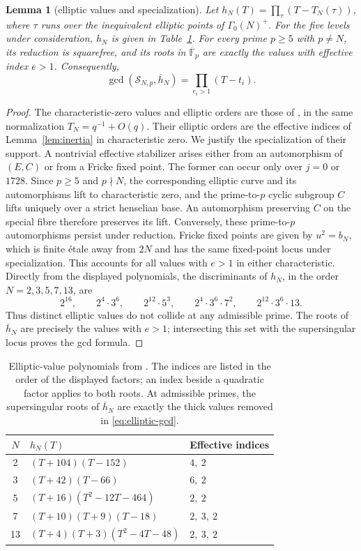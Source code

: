 \documentclass[11pt,a4paper]{article}
\numberwithin{equation}{section}
\newtheorem{lemma}[theorem]{Lemma}
\theoremstyle{definition}
\theoremstyle{remark}
\newcommand{\Fb}{\overline{\mathbb F}_p}
\begin{document}
\begin{lemma}[elliptic values and specialization]\label{lem:elliptic-specialization}
Let $h_N(T)=\prod_{\tau}(T-T_N(\tau))$, where $\tau$ runs over the
inequivalent elliptic points of $\Gamma_0(N)^+$. For the five levels under
consideration, $h_N$ is given in Table~\ref{tab:elliptic-values}.
For every prime $p\ge5$ with $p\ne N$, its reduction is squarefree, and
its roots in $\Fb$ are exactly the values with effective index $e>1$.
Consequently,
\[
\gcd(\mathcal S_{N,p},\overline h_N)=\prod_{e_i>1}(T-t_i).
\]
\end{lemma}
\begin{proof}
The characteristic-zero values and elliptic orders are those of
\citet[\S4.2, Table~1 and Appendix~C]{JST19}, in the same normalization
$T_N=q^{-1}+O(q)$. Their elliptic orders are the effective indices of
Lemma~\ref{lem:inertia} in characteristic zero.
We justify the specialization of their support. A nontrivial effective
stabilizer arises either from an automorphism of $(E,C)$ or from a Fricke
fixed point. The former can occur only over $j=0$ or $1728$. Since
$p\ge5$ and $p\nmid N$, the corresponding elliptic curve and its
automorphisms lift to characteristic zero, and the prime-to-$p$ cyclic
subgroup $C$ lifts uniquely over a strict henselian base. An automorphism
preserving $C$ on the special fibre therefore preserves its lift.
Conversely, these prime-to-$p$ automorphisms persist under reduction.
Fricke fixed points are given by $u^2=b_N$, which is finite \'etale away
from $2N$ and has the same fixed-point locus under specialization.
This accounts for all values with $e>1$ in either characteristic.
Directly from the displayed polynomials, the discriminants of $h_N$, in
the order $N=2,3,5,7,13$, are
\[
2^{16},\qquad 2^4\cdot3^6,\qquad 2^{12}\cdot5^3,\qquad
2^4\cdot3^6\cdot7^2,\qquad 2^{12}\cdot3^6\cdot13.
\]
Thus distinct elliptic values do not collide at any admissible prime.
The roots of $\overline h_N$ are precisely the values with $e>1$;
intersecting this set with the supersingular locus proves the gcd formula.
\end{proof}

\begin{table}[htbp]\centering
\begin{tabular}{cll}\toprule
$N$ & $h_N(T)$ & Effective indices\\\midrule
2 & $(T+104)(T-152)$ & $4,\ 2$\\
3 & $(T+42)(T-66)$ & $6,\ 2$\\
5 & $(T+16)(T^2-12T-464)$ & $2,\ 2$\\
7 & $(T+10)(T+9)(T-18)$ & $2,\ 3,\ 2$\\
13 & $(T+4)(T+3)(T^2-4T-48)$ & $2,\ 3,\ 2$\\\bottomrule
\end{tabular}
\caption{Elliptic-value polynomials from \citet{JST19}.
The indices are listed in the order of the displayed factors; an index
beside a quadratic factor applies to both roots. At admissible primes,
the supersingular roots of $\overline h_N$ are exactly the thick values
removed in \eqref{eq:elliptic-gcd}.}
\label{tab:elliptic-values}
\end{table}
\end{document}
